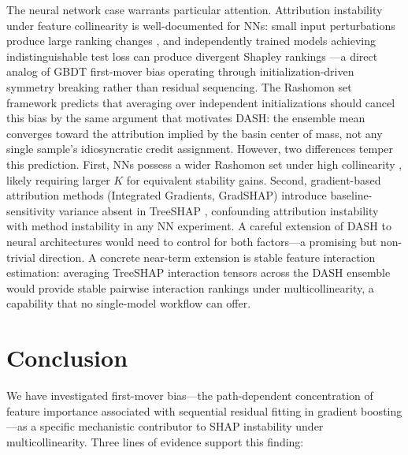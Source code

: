 \documentclass[11pt]{article}
\newcommand{\dash}{\textsc{DASH}}
\begin{document}
The neural network case warrants particular attention. Attribution
instability under feature collinearity is well-documented for NNs:
small input perturbations produce large ranking changes
\citep{ghorbani2019interpretation}, and independently trained models
achieving indistinguishable test loss can produce divergent Shapley
rankings \citep{damour2020underspecification}---a direct analog of
GBDT first-mover bias operating through initialization-driven symmetry
breaking rather than residual sequencing. The Rashomon set framework
\citep{fisher2019all, semenova2022existence} predicts that averaging
over independent initializations should cancel this bias by the same
argument that motivates \dash{}: the ensemble mean converges toward
the attribution implied by the basin center of mass, not any single
sample's idiosyncratic credit assignment. However, two differences
temper this prediction. First, NNs possess a wider Rashomon set under
high collinearity \citep{damour2020underspecification}, likely
requiring larger $K$ for equivalent stability gains. Second,
gradient-based attribution methods (Integrated Gradients, GradSHAP)
introduce baseline-sensitivity variance absent in TreeSHAP
\citep{alvarez2018towards}, confounding attribution instability with
method instability in any NN experiment. A careful extension of \dash{}
to neural architectures would need to control for both factors---a
promising but non-trivial direction. A concrete near-term extension
is stable feature interaction estimation: averaging TreeSHAP interaction
tensors across the \dash{} ensemble would provide stable pairwise
interaction rankings under multicollinearity, a capability that no
single-model workflow can offer.


\section{Conclusion}
\label{sec:conclusion}

We have investigated first-mover bias---the path-dependent concentration of
feature importance associated with sequential residual fitting in gradient
boosting---as a specific mechanistic contributor to SHAP instability under
multicollinearity. Three lines of evidence support this finding:
\end{document}
